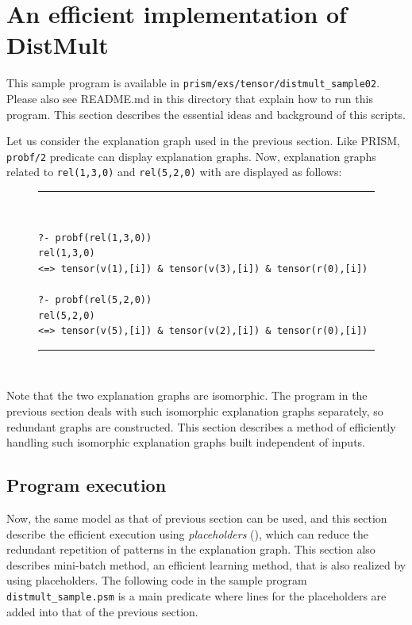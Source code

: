 \documentclass[a4paper]{report}
\begin{document}
\section{An efficient implementation of DistMult}
\label{sec:distmult02}

This sample program is available in \verb|prism/exs/tensor/distmult_sample02|.
Please also see README.md in this directory that explain how to run  this program.
This section describes the essential ideas and background of this scripts. 


Let us consider the explanation graph used in the previous section.
Like PRISM, {\tt probf/2} predicate can display explanation graphs.
Now, explanation graphs related to {\tt rel(1,3,0)} and {\tt rel(5,2,0)} with  are displayed as follows:

\begin{figure}[h]
	\rule{0.85\textwidth}{0.10mm}\\ [-1em]
	\begin{verbatim}
?- probf(rel(1,3,0))
rel(1,3,0)
<=> tensor(v(1),[i]) & tensor(v(3),[i]) & tensor(r(0),[i])

?- probf(rel(5,2,0))
rel(5,2,0)
<=> tensor(v(5),[i]) & tensor(v(2),[i]) & tensor(r(0),[i])
\end{verbatim}
\rule{0.85\textwidth}{0.10mm}\\ [-1em]
\end{figure}

Note that the two explanation graphs are isomorphic.
The program in the previous section deals with such isomorphic explanation graphs separately, so redundant graphs are constructed.
This section describes a method of efficiently handling such isomorphic explanation graphs built independent of inputs.

\subsection*{Program execution}

Now, the same model as that of previous section can be used, and this section describe the efficient execution using {\it placeholders} (), which can reduce the redundant repetition of patterns in the explanation graph.
This section also describes mini-batch method, an efficient learning method, that is also realized by using placeholders.
The following code in the sample program {\tt distmult\_sample.psm} is a main predicate where lines for the placeholders are added into that of the previous section.
\end{document}
